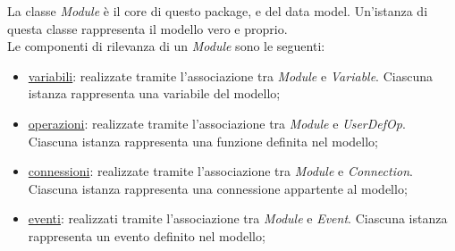 
La classe \textit{Module} è il core di questo package, e del data model. Un'istanza di questa classe rappresenta il modello vero e proprio. \\
Le componenti di rilevanza di un \textit{Module} sono le seguenti:
\begin{itemize}
	\item \hyperref[sec:modelstranslator:analysis:model_analysis:variable]{variabili}: realizzate tramite l'associazione tra \textit{Module} e \textit{Variable}. Ciascuna istanza rappresenta una variabile del modello;
	\item \hyperref[sec:modelstranslator:analysis:model_analysis:operation:userdefop]{operazioni}: realizzate tramite l'associazione tra \textit{Module} e \textit{UserDefOp}. Ciascuna istanza rappresenta una funzione definita nel modello;
	\item \hyperref[sec:modelstranslator:analysis:model_analysis:connection]{connessioni}: realizzate tramite l'associazione tra \textit{Module} e \textit{Connection}. Ciascuna istanza rappresenta una connessione appartente al modello;
	\item \hyperref[sec:modelstranslator:analysis:model_analysis:event]{eventi}: realizzati tramite l'associazione tra \textit{Module} e \textit{Event}. Ciascuna istanza rappresenta un evento definito nel modello;
\end{itemize}